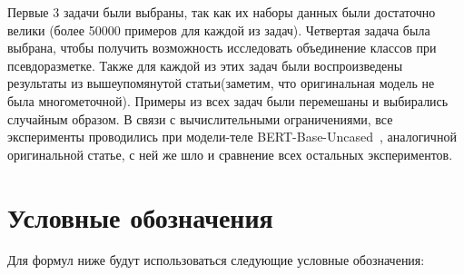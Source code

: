 Первые 3 задачи были выбраны, так как их наборы данных были достаточно велики (более 50000 примеров для каждой из задач). Четвертая задача была выбрана, чтобы получить возможность исследовать объединение классов при псевдоразметке. Также для каждой из этих задач были воспроизведены результаты из вышеупомянутой статьи(заметим, что оригинальная модель не была многометочной). Примеры из всех задач были перемешаны и выбирались случайным образом. В связи с вычислительными ограничениями, все эксперименты проводились при модели-теле BERT-Base-Uncased~\cite{devlin_2018}, аналогичной оригинальной статье, с ней же шло и сравнение всех остальных экспериментов.

\section{Условные обозначения}\label{subch:pseudolabel/sect2}
   Для формул ниже будут использоваться следующие условные обозначения:
